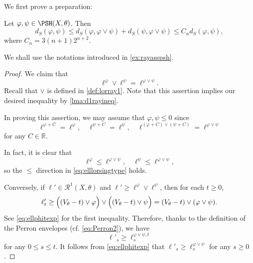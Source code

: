 We first prove a preparation:
\begin{lemma}\label{lma:dSalmostriang}
    Let $\varphi,\psi\in \PSH(X,\theta)$. Then
    \[
        d_S(\varphi,\psi)\leq d_S(\varphi,\varphi\lor \psi)+d_S(\psi,\varphi\lor \psi) \leq C_n d_S(\varphi,\psi),
    \]
    where $C_n=3(n+1)2^{n+2}$.
\end{lemma}
We shall use the notations introduced in \cref{ex:rayasspsh}.
\begin{proof}
    We claim that
    \begin{equation}\label{eq:elllorsingtype}
        \ell^{\varphi}\lor \ell^{\psi}=\ell^{\varphi\lor \psi}.
    \end{equation}
    Recall that $\lor$ is defined in \cref{def:lorray1}.
    Note that this assertion implies our desired inequality by \cref{lma:d1rayineq}.

    In proving this assertion, we may assume that $\varphi,\psi\leq 0$ since
    \[
    \ell^{\varphi+C}=\ell^{\varphi},\quad \ell^{\psi+C}=\ell^{\psi},\quad \ell^{(\varphi+C)\lor (\psi+C)}=\ell^{\varphi\lor \psi}
    \]
    for any $C\in \mathbb{R}$.

    In fact, it is clear that
    \[
        \ell^{\varphi}\leq   \ell^{\varphi\lor \psi},\quad \ell^{\psi}\leq   \ell^{\varphi\lor \psi},
    \]
    so the $\leq$ direction in \eqref{eq:elllorsingtype} holds.

    Conversely, if $\ell'\in \mathcal{R}^1(X,\theta)$ and $\ell'\geq \ell^{\varphi}\lor \ell^{\psi}$, then for each $t\geq 0$,
    \[
        \ell'_t\geq \Bigl((V_{\theta}-t)\lor \varphi\Bigr) \lor \Bigl((V_{\theta}-t)\lor \psi\Bigr)=(V_{\theta}-t)\lor (\varphi\lor \psi).
    \]
    See \eqref{eq:ellphitexp} for the first inequality.
    Therefore, thanks to the definition of the Perron envelopes (cf. \eqref{eq:Perron2}), we have
    \[
    \ell'_s\geq \ell^{\varphi\lor \psi,t}_s
    \]
    for any $0\leq s\leq t$.
    It follows from \eqref{eq:ellphitexp} that $\ell'_s\geq \ell^{\varphi\lor \psi}_s$ for any $s\geq 0$.
\end{proof}


